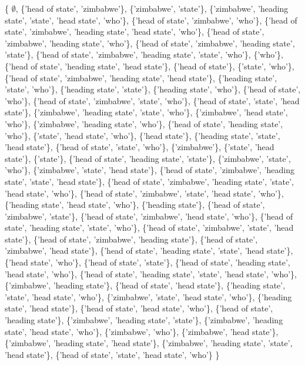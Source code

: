 \begin{enumerate}
  \{ $\emptyset$, \{'head of state', 'zimbabwe'\}, \{'zimbabwe', 'state'\}, \{'zimbabwe', 'heading state', 'state', 'head state', 'who'\}, \{'head of state', 'zimbabwe', 'who'\}, \{'head of state', 'zimbabwe', 'heading state', 'head state', 'who'\}, \{'head of state', 'zimbabwe', 'heading state', 'who'\}, \{'head of state', 'zimbabwe', 'heading state', 'state'\}, \{'head of state', 'zimbabwe', 'heading state', 'state', 'who'\}, \{'who'\}, \{'head of state', 'heading state', 'head state'\}, \{'head of state'\}, \{'state', 'who'\}, \{'head of state', 'zimbabwe', 'heading state', 'head state'\}, \{'heading state', 'state', 'who'\}, \{'heading state', 'state'\}, \{'heading state', 'who'\}, \{'head of state', 'who'\}, \{'head of state', 'zimbabwe', 'state', 'who'\}, \{'head of state', 'state', 'head state'\}, \{'zimbabwe', 'heading state', 'state', 'who'\}, \{'zimbabwe', 'head state', 'who'\}, \{'zimbabwe', 'heading state', 'who'\}, \{'head of state', 'heading state', 'who'\}, \{'state', 'head state', 'who'\}, \{'head state'\}, \{'heading state', 'state', 'head state'\}, \{'head of state', 'state', 'who'\}, \{'zimbabwe'\}, \{'state', 'head state'\}, \{'state'\}, \{'head of state', 'heading state', 'state'\}, \{'zimbabwe', 'state', 'who'\}, \{'zimbabwe', 'state', 'head state'\}, \{'head of state', 'zimbabwe', 'heading state', 'state', 'head state'\}, \{'head of state', 'zimbabwe', 'heading state', 'state', 'head state', 'who'\}, \{'head of state', 'zimbabwe', 'state', 'head state', 'who'\}, \{'heading state', 'head state', 'who'\}, \{'heading state'\}, \{'head of state', 'zimbabwe', 'state'\}, \{'head of state', 'zimbabwe', 'head state', 'who'\}, \{'head of state', 'heading state', 'state', 'who'\}, \{'head of state', 'zimbabwe', 'state', 'head state'\}, \{'head of state', 'zimbabwe', 'heading state'\}, \{'head of state', 'zimbabwe', 'head state'\}, \{'head of state', 'heading state', 'state', 'head state'\}, \{'head state', 'who'\}, \{'head of state', 'state'\}, \{'head of state', 'heading state', 'head state', 'who'\}, \{'head of state', 'heading state', 'state', 'head state', 'who'\}, \{'zimbabwe', 'heading state'\}, \{'head of state', 'head state'\}, \{'heading state', 'state', 'head state', 'who'\}, \{'zimbabwe', 'state', 'head state', 'who'\}, \{'heading state', 'head state'\}, \{'head of state', 'head state', 'who'\}, \{'head of state', 'heading state'\}, \{'zimbabwe', 'heading state', 'state'\}, \{'zimbabwe', 'heading state', 'head state', 'who'\}, \{'zimbabwe', 'who'\}, \{'zimbabwe', 'head state'\}, \{'zimbabwe', 'heading state', 'head state'\}, \{'zimbabwe', 'heading state', 'state', 'head state'\}, \{'head of state', 'state', 'head state', 'who'\} \}

\end{enumerate}
